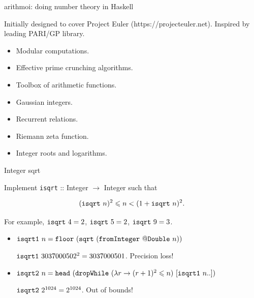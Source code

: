 \documentclass[handout]{beamer}
\def\le{\leqslant}
\def\isqrt#1{{\tt isqrt}~#1}
\def\isqrta#1{{\tt isqrt1}~#1}
\def\isqrtb#1{{\tt isqrt2}~#1}
\begin{document}
\begin{frame}{arithmoi: doing number theory in Haskell}

Initially designed to cover Project Euler (https://projecteuler.net).
Inspired by leading PARI/GP library.

\begin{itemize}
\item Modular computations.
\item Effective prime crunching algorithms.
\item Toolbox of arithmetic functions.
\item Gaussian integers.
\item Recurrent relations.
\item Riemann zeta function.
\item Integer roots and logarithms.
\end{itemize}

\end{frame}

\begin{frame}{Integer sqrt}
\begin{adjustwidth}{-1.5em}{-1.5em}

Implement {\tt isqrt} :: Integer $\to$ Integer such that

$$(\isqrt n)^2 \le n < (1 + \isqrt n)^2.$$

For example, $\isqrt 4 = 2$, $\isqrt 5 = 2$, $\isqrt 9 = 3$.

\bigskip

\begin{itemize}

\item $\isqrta n = {\tt floor}~({\tt sqrt}~({\tt fromInteger}~@{\tt Double}~n))$

\bigskip

  $\isqrta 3037000502^2 = 3037000501$. Precision loss!

\bigskip

\item $\isqrtb n = {\tt head}~({\tt dropWhile}~(\lambda r \to (r+1)^2 \le n)~[\isqrta n..])$

\bigskip

  $\isqrtb 2^{1024} = 2^{1024}$. Out of bounds!

\end{itemize}

\end{adjustwidth}
\end{frame}
\end{document}
